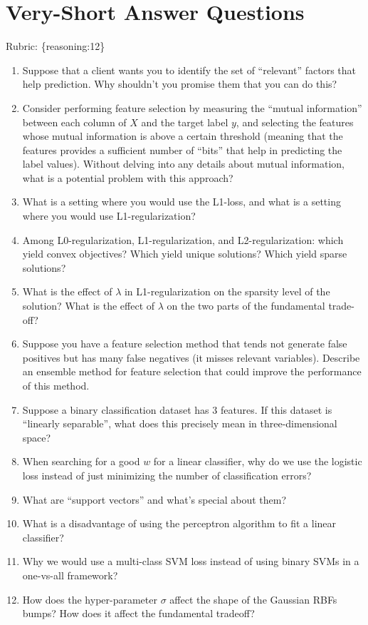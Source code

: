 \documentclass{article}
\def\rubric#1{\gre{Rubric: \{#1\}}}{}
\def\gre#1{{\color{gre}#1}}
\def\enum#1{\begin{enumerate}#1\end{enumerate}}
\begin{document}
\section{Very-Short Answer Questions}
\rubric{reasoning:12}


\enum{
\item Suppose that a client wants you to identify the set of ``relevant'' factors that help prediction. Why shouldn't you promise them that you can do this?
\item Consider performing feature selection by measuring the ``mutual information'' between each column of $X$ and the target label $y$, and selecting the features whose mutual information is above a certain threshold (meaning that the features provides a sufficient number of ``bits'' that help in predicting the label values). Without delving into any details about mutual information, what is a potential problem with this approach?
\item What is a setting where you would use the L1-loss, and what is a setting where you would use L1-regularization?
\item Among L0-regularization, L1-regularization, and L2-regularization: which yield convex objectives? Which yield unique solutions? Which yield sparse solutions?
\item What is the effect of $\lambda$ in L1-regularization on the sparsity level of the solution? What is the effect of $\lambda$ on the two parts of the fundamental trade-off?
\item Suppose you have a feature selection method that tends not generate false positives but has many false negatives (it misses relevant variables). Describe an ensemble method for feature selection that could improve the performance of this method.
\item Suppose a binary classification dataset has 3 features. If this dataset is ``linearly separable'', what does this precisely mean in three-dimensional space?
\item When searching for a good $w$ for a linear classifier, why do we use the logistic loss instead of just minimizing the number of classification errors?
\item What are ``support vectors'' and what's special about them?
\item What is a disadvantage of using the perceptron algorithm to fit a linear classifier?
\item Why we would use a multi-class SVM loss instead of using binary SVMs in a one-vs-all framework?
\item How does the hyper-parameter $\sigma$ affect the shape of the Gaussian RBFs bumps? How does it affect the fundamental tradeoff?
}
\end{document}
